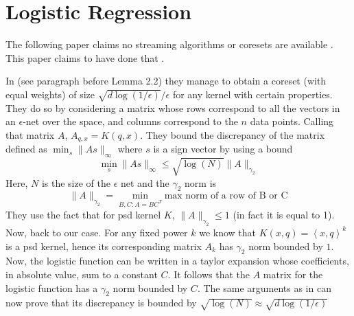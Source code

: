 \documentclass[anon,12pt]{colt2019} %
\newcommand{\ip}[1]{\left \langle #1 \right \rangle}
\newcommand{\eps}{\epsilon}
\begin{document}
%


\section{Logistic Regression}
The following paper claims no streaming algorithms or coresets are available \cite{DBLP:journals/corr/abs-1805-08571}.
This paper claims to have done that \cite{DBLP:conf/nips/HugginsCB16}.

In \cite{DBLP:journals/corr/abs-1802-01751} (see paragraph before Lemma 2.2) they manage to obtain a coreset (with equal weights) of size $\sqrt{d \log(1/\eps)}/\eps$ for any kernel with certain properties. They do so by considering a matrix whose rows correspond to all the vectors in an $\eps$-net over the space, and columns correspond to the $n$ data points. Calling that matrix $A$, $A_{q,x} = K(q,x)$. They bound the discrepancy of the matrix defined as $\min_s \|As\|_\infty$ where $s$ is a sign vector by using a bound 
$$ \min_s \|As\|_\infty \leq \sqrt{\log(N)} \|A\|_{\gamma_2} $$
Here, $N$ is the size of the $\eps$ net and the $\gamma_2$ norm is 
$$ \|A\|_{\gamma_2} = \min_{B,C: A=BC^T} \text{max norm of a row of B or C}$$
They use the fact that for psd kernel $K$, $\|A\|_{\gamma_2} \leq 1$ (in fact it is equal to 1). Now, back to our case. For any fixed power $k$ we know that $K(x,q)=\ip{x,q}^k$ is a psd kernel, hence its corresponding matrix $A_k$ has $\gamma_2$ norm bounded by $1$. Now, the logistic function can be written in a taylor expansion whose coefficients, in absolute value, sum to a constant $C$. It follows that the $A$ matrix for the logistic function has a $\gamma_2$ norm bounded by $C$. The same arguments as in  \cite{DBLP:journals/corr/abs-1802-01751} can now prove that its discrepancy is bounded by $\sqrt{\log(N)} \approx \sqrt{d\log(1/\eps)}$
\end{document}
